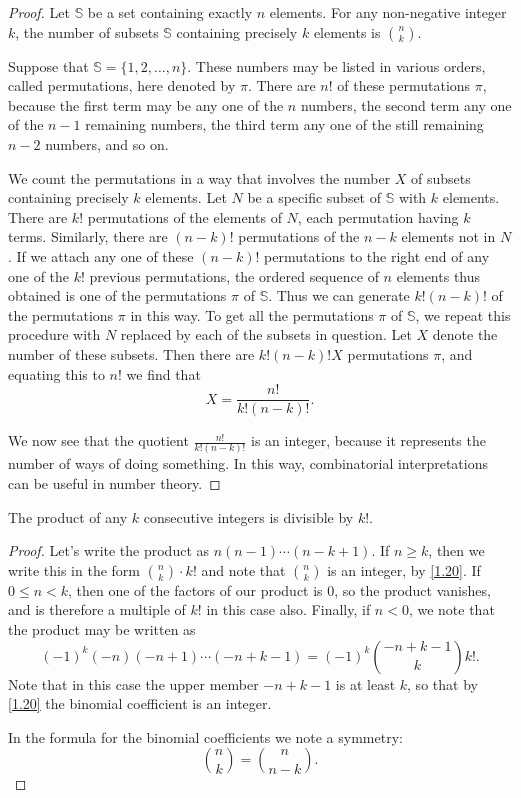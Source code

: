 \documentclass[11pt]{article}
\begin{document}
\begin{proof}
    Let \(\mathbb{S}\) be a set containing exactly \(n\) elements. For any non-negative integer \(k\), the number of subsets \(\mathbb{S}\) containing precisely \(k\) elements is \(\binom{n}{k}\).

    Suppose that \(\mathbb{S} = \{1, 2, \ldots, n\}\). These numbers may be listed
    in various orders, called permutations, here denoted by \(\pi\). There are
    \(n!\) of these permutations \(\pi\), because the first term may be any one of
    the \(n\) numbers, the second term any one of the \(n - 1\) remaining numbers,
    the third term any one of the still remaining \(n - 2\) numbers, and so on.

    We count the permutations in a way that involves the number \(X\) of subsets
    containing precisely \(k\) elements. Let \(N\) be a specific subset of
    \(\mathbb{S}\) with \(k\) elements. There are \(k!\) permutations of the
    elements of \(N\), each permutation having \(k\) terms. Similarly, there are
    \((n - k)!\) permutations of the \(n - k\) elements not in \(N\). If we attach
    any one of these \((n - k)!\) permutations to the right end of any one of the
    \(k!\) previous permutations, the ordered sequence of \(n\) elements thus
    obtained is one of the permutations \(\pi\) of \(\mathbb{S}\). Thus we can
    generate \(k!(n - k)!\) of the permutations \(\pi\) in this way. To get all the
    permutations \(\pi\) of \(\mathbb{S}\), we repeat this procedure with \(N\)
    replaced by each of the subsets in question. Let \(X\) denote the number of
    these subsets. Then there are \(k!(n - k)!X\) permutations \(\pi\), and
    equating this to \(n!\) we find that
    \[
        X = \frac{n!}{k!(n - k)!}.
    \]

    We now see that the quotient \(\frac{n!}{k! (n - k)!}\) is an integer, because
    it represents the number of ways of doing something. In this way, combinatorial
    interpretations can be useful in number theory.
\end{proof}
\begin{theorem}\label{1.21}
    The product of any \(k\) consecutive integers is divisible by \(k!\).
\end{theorem}
\begin{proof}
    Let's write the product as \(n(n - 1) \cdots (n - k + 1)\). If \(n \geq k\), then we write this in the form \(\binom{n}{k} \cdot k!\) and note that \(\binom{n}{k}\) is an integer, by \cref{1.20}. If \(0 \leq n < k\), then one of the factors of our product is 0, so the product vanishes, and is therefore a multiple of \(k!\) in this case also. Finally, if \(n < 0\), we note that the product may be written as
    \[
        (-1)^k (-n)(-n + 1) \cdots (-n + k - 1) = (-1)^k \binom{-n + k - 1}{k} k!.
    \]
    Note that in this case the upper member \(-n + k - 1\) is at least \(k\), so
    that by \cref{1.20} the binomial coefficient is an integer.

    In the formula for the binomial coefficients we note a symmetry:
    \[
        \binom{n}{k} = \binom{n}{n - k}.
    \]
\end{proof}
\end{document}
